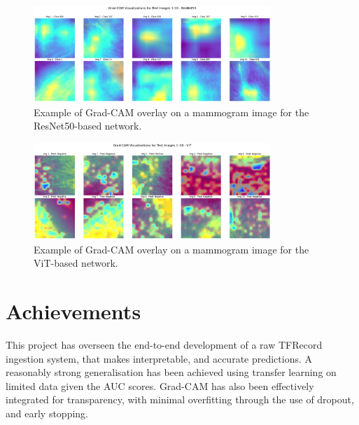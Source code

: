 \documentclass[../main]{subfiles}
\begin{document}
\begin{figure}[h]
    \centering
    \includegraphics[width=0.8\textwidth]{assets/grad_cam_resnet50.png}
    \caption{Example of Grad-CAM overlay on a mammogram image for the ResNet50-based network.}
    \label{fig:grad-cam-resnet50}
\end{figure}

\begin{figure}[h]
    \centering
    \includegraphics[width=0.8\textwidth]{assets/grad_cam_vit.png}
    \caption{Example of Grad-CAM overlay on a mammogram image for the ViT-based network.}
    \label{fig:grad-cam-vit}
\end{figure}

\section{Achievements}
This project has overseen the end-to-end development of a raw TFRecord ingestion system, that makes interpretable, and accurate predictions. A reasonably strong generalisation has been achieved using transfer learning on limited data given the AUC scores. Grad-CAM has also been effectively integrated for transparency, with minimal overfitting through the use of dropout, and early stopping.
\end{document}
